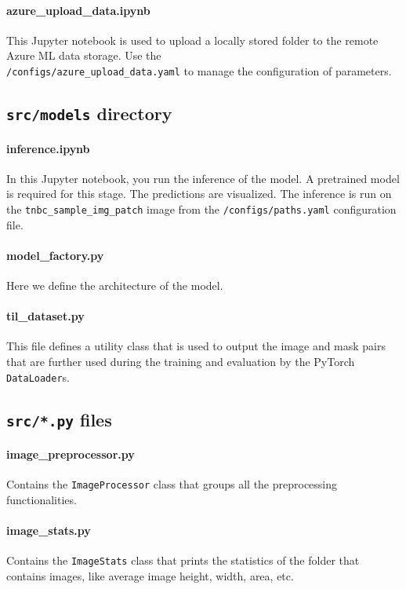 \paragraph{azure\_upload\_data.ipynb}
This Jupyter notebook is used to upload a locally stored folder to the
remote Azure ML data storage. Use the \\
\texttt{/configs/azure\_upload\_data.yaml} to manage the configuration
of parameters.

\subsection{\texttt{src/models} directory}\label{srcmodels-directory}

\paragraph{inference.ipynb}
In this Jupyter notebook, you run the inference of the model. A
pretrained model is required for this stage. The predictions are
visualized. The inference is run on the
\texttt{tnbc\_sample\_img\_patch} image from the
\texttt{/configs/paths.yaml} configuration file.

\paragraph{model\_factory.py}
Here we define the architecture of the model.

\paragraph{til\_dataset.py}
This file defines a utility class that is used to output the image and
mask pairs that are further used during the training and evaluation by
the PyTorch \texttt{DataLoader}s.

\subsection{\texttt{src/*.py} files}\label{src.py-files}

\paragraph{image\_preprocessor.py}
Contains the \texttt{ImageProcessor} class that groups all the
preprocessing functionalities.

\paragraph{image\_stats.py}
Contains the \texttt{ImageStats} class that prints the statistics of the
folder that contains images, like average image height, width, area,
etc.

